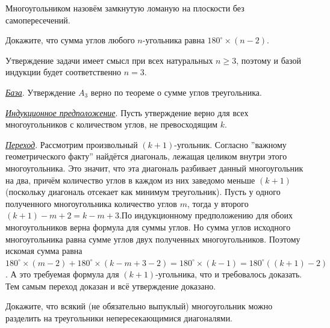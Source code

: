 \begin{dfn}
Многоугольником назовём замкнутую ломаную на плоскости без самопересечений.
\end{dfn}


\begin{thm}
Докажите, что сумма углов любого $n$-угольника равна $180 ^{\circ} \times (n - 2)$.
\end{thm}

\begin{prf}
Утверждение задачи имеет смысл при всех натуральных $n \geq 3$, поэтому и базой индукции будет соответственно $n = 3$.
\par
\textit{\underline{База}}. Утверждение $A_3$ верно по теореме о сумме углов треугольника.
\par
\textit{\underline{Индукционное предположение}}. Пусть утверждение верно для всех многоугольников с количеством углов, не превосходящим $k$.
\par
\textit{\underline{Переход}}. Рассмотрим произвольный $(k + 1)$-угольник. Согласно ''важному геометрического факту'' найдётся диагональ, лежащая целиком внутри этого многоугольника. Это значит, что эта диагональ разбивает данный многоугольник на два, причём количество углов в каждом из них заведомо меньше $(k + 1)$ (поскольку диагональ отсекает как минимум треугольник). Пусть у одного полученного многоугольника количество углов $m$, тогда у второго $(k + 1) - m + 2 = k - m + 3$.\footnotemark По
индукционному предположению для обоих многоугольников верна формула для суммы углов. Но сумма
углов исходного многоугольника равна сумме углов двух полученных многоугольников. Поэтому искомая сумма равна $180 ^{\circ} \times (m - 2) + 180 ^{\circ} \times (k - m + 3 - 2) = 180 ^{\circ} \times (k - 1) = 180 ^{\circ} ((k + 1) - 2)$. А это требуемая
формула для $(k + 1)$-угольника, что и требовалось доказать.
Тем самым переход доказан и всё утверждение доказано.
\end{prf}

\begin{thm}
Докажите, что всякий (не обязательно выпуклый) многоугольник можно разделить на треугольники непересекающимися диагоналями.
\end{thm}

